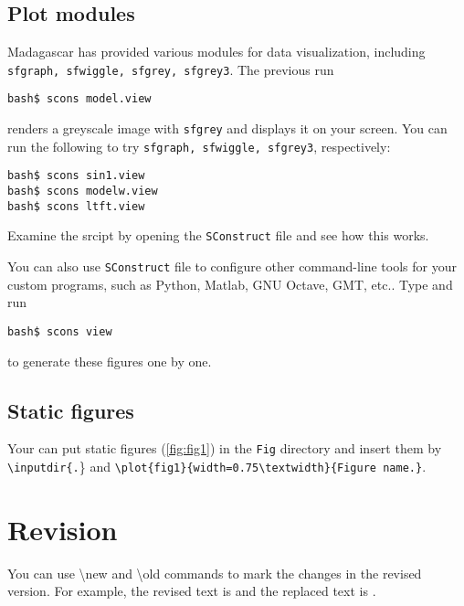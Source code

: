 

\subsection{Plot modules}
Madagascar has provided various modules for data visualization, including \texttt{sfgraph, sfwiggle, sfgrey, sfgrey3}. The previous run
\begin{verbatim}
bash$ scons model.view
\end{verbatim}
renders a greyscale image with \texttt{sfgrey} and displays it on your screen. You can run the following to try \texttt{sfgraph, sfwiggle, sfgrey3}, respectively:
\begin{verbatim}
bash$ scons sin1.view
bash$ scons modelw.view
bash$ scons ltft.view
\end{verbatim}
Examine the srcipt by opening the \texttt{SConstruct} file and see how this works.

You can also use \texttt{SConstruct} file to configure other command-line tools for your custom programs, such as Python, Matlab, GNU Octave, GMT, etc.. Type and run

\begin{verbatim}
bash$ scons view
\end{verbatim}
to generate these figures one by one.

\subsection{Static figures}
Your can put static figures (\ref{fig:fig1}) in the \texttt{Fig} directory and insert them by \texttt{\textbackslash inputdir\{.}\} and \texttt{\textbackslash plot\{fig1\}\{width=0.75\textbackslash textwidth\}\{Figure name.\}}.


\section{Revision}
You can use \textbackslash new and \textbackslash old commands to mark the changes in the revised version. For example, the revised text is  and the replaced text is . 



